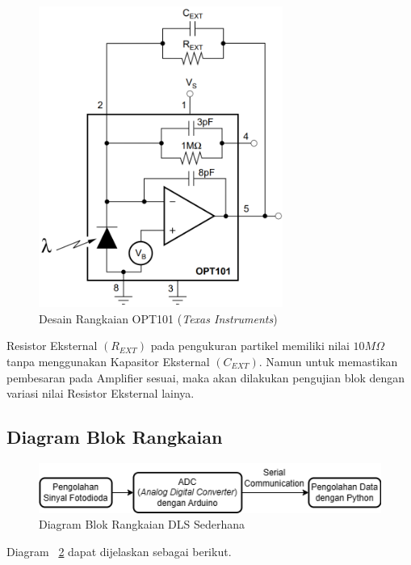 \begin{figure}[H]
    \centering
    \includegraphics[width=8cm]{Images/Schema OPT101.png}
    \caption{Desain Rangkaian OPT101 (\textit{Texas Instruments})}
    \label{fig:schemaopt101}
\end{figure}
\noindent
Resistor Eksternal ${\left(R_{EXT} \right)}$ pada pengukuran partikel memiliki nilai
${10M \Omega}$ tanpa menggunakan Kapasitor Eksternal ${\left(C_{EXT}\right)}$. Namun untuk
memastikan pembesaran pada Amplifier sesuai, maka akan dilakukan
pengujian blok dengan variasi nilai Resistor Eksternal lainya.



\subsection{Diagram Blok Rangkaian}
\begin{figure}[H]
    \centering
    \includegraphics[width=12cm]{Images/Block Diagram.png}
    \caption{Diagram Blok Rangkaian DLS Sederhana}
    \label{fig:blockdiag}
\end{figure}

Diagram ~\ref{fig:blockdiag} dapat dijelaskan sebagai berikut.


